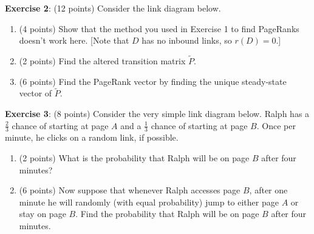 \documentclass{article}
\begin{document}
\textbf{Exercise 2}: (12 points) Consider the link diagram below.

\begin{center}
\end{center}

\begin{enumerate}[label=\alph*.]

  \item (4 points) Show that the method you used in Exercise 1 to find PageRanks doesn't work here. [Note that $D$ has no inbound links, so $r(D) = 0$.]

  \item (2 points) Find the altered transition matrix $\widetilde{P}$.

  \item (6 points) Find the PageRank vector by finding the unique steady-state vector of $\widetilde{P}$.

\end{enumerate}

\textbf{Exercise 3}: (8 points) Consider the very simple link diagram below. Ralph has a $\frac{2}{3}$ chance of starting at page $A$ and a $\frac{1}{3}$ chance of starting at page $B$. Once per minute, he clicks on a random link, if possible.

\begin{center}
\end{center}

\begin{enumerate}[label=\alph*.]

  \item (2 points) What is the probability that Ralph will be on page $B$ after four minutes?

  \item (6 points) Now suppose that whenever Ralph accesses page $B$, after one minute he will randomly (with equal probability) jump to either page $A$ or stay on page $B$. Find the probability that Ralph will be on page $B$ after four minutes.

\end{enumerate}
\end{document}
